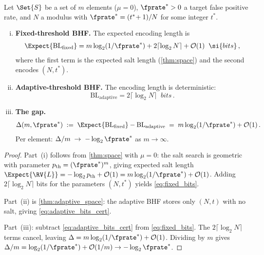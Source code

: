 \begin{theorem}
\label{thm:price_certainty}
Let $\Set{S}$ be a set of $m$ elements ($\mu = 0$), $\fprate^* > 0$ a target
false positive rate, and $N$ a modulus with
$\fprate^* = (t^*\!+1)/N$ for some integer $t^*$.
\begin{enumerate}[(i)]
    \item \textbf{Fixed-threshold BHF.}
    The expected encoding length is
    \begin{equation}
    \label{eq:fixed_bits}
        \Expect{\mathrm{BL}_{\mathrm{fixed}}}
        = m \log_2(1/\fprate^*) + 2\lceil \log_2 N \rceil
          + \mathcal{O}(1) \;\;\si{bits}\,,
    \end{equation}
    where the first term is the expected salt length
    (\cref{thm:space}) and the second encodes $(N, t^*)$.

    \item \textbf{Adaptive-threshold BHF.}
    The encoding length is deterministic:
    \begin{equation}
    \label{eq:adaptive_bits_cert}
        \mathrm{BL}_{\mathrm{adaptive}}
        = 2\lceil \log_2 N \rceil \;\;\si{bits}\,.
    \end{equation}

    \item \textbf{The gap.}
    \begin{equation}
    \label{eq:gap}
        \Delta(m, \fprate^*)
        \;:=\; \Expect{\mathrm{BL}_{\mathrm{fixed}}}
             - \mathrm{BL}_{\mathrm{adaptive}}
        \;=\; m \log_2(1/\fprate^*) + \mathcal{O}(1)\,.
    \end{equation}
    Per element: $\Delta / m \;\to\; -\log_2 \fprate^*$ as $m \to \infty$.
\end{enumerate}
\end{theorem}

\begin{proof}
Part~(i) follows from \cref{thm:space} with $\mu = 0$: the salt search is
geometric with parameter $p_{\mathrm{th}} = (\fprate^*)^m$, giving expected
salt length $\Expect{\RV{L}} = -\log_2 p_{\mathrm{th}} + \mathcal{O}(1)
= m \log_2(1/\fprate^*) + \mathcal{O}(1)$.
Adding $2\lceil \log_2 N \rceil$ bits for the parameters $(N, t^*)$ yields
\cref{eq:fixed_bits}.

Part~(ii) is \cref{thm:adaptive_space}: the adaptive BHF stores only
$(N, t)$ with no salt, giving \cref{eq:adaptive_bits_cert}.

Part~(iii): subtract \cref{eq:adaptive_bits_cert} from \cref{eq:fixed_bits}.
The $2\lceil \log_2 N \rceil$ terms cancel, leaving
$\Delta = m \log_2(1/\fprate^*) + \mathcal{O}(1)$.
Dividing by $m$ gives $\Delta/m = \log_2(1/\fprate^*) + \mathcal{O}(1/m)
\to -\log_2 \fprate^*$.
\end{proof}

